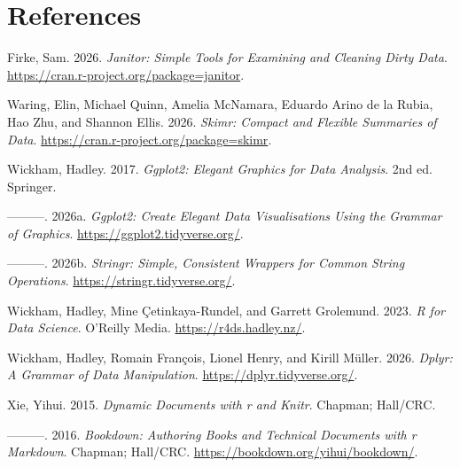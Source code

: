 \documentclass[
  11pt,
  oneside]{book}
\newlength{\cslhangindent}
\newenvironment{CSLReferences}[2] %
 {\begin{list}{}{%
  \setlength{\itemindent}{0pt}
  \setlength{\leftmargin}{0pt}
  \setlength{\parsep}{0pt}
  \ifodd #1
   \setlength{\leftmargin}{\cslhangindent}
   \setlength{\itemindent}{-1\cslhangindent}
  \fi
  \setlength{\itemsep}{#2\baselineskip}}}
 {\end{list}}
\begin{document}
\chapter*{References}\label{references}

\label{refs}
\begin{CSLReferences}{1}{0}
Firke, Sam. 2026. \emph{Janitor: Simple Tools for Examining and Cleaning Dirty Data}. \url{https://cran.r-project.org/package=janitor}.

Waring, Elin, Michael Quinn, Amelia McNamara, Eduardo Arino de la Rubia, Hao Zhu, and Shannon Ellis. 2026. \emph{Skimr: Compact and Flexible Summaries of Data}. \url{https://cran.r-project.org/package=skimr}.

Wickham, Hadley. 2017. \emph{Ggplot2: Elegant Graphics for Data Analysis}. 2nd ed. Springer.

---------. 2026a. \emph{Ggplot2: Create Elegant Data Visualisations Using the Grammar of Graphics}. \url{https://ggplot2.tidyverse.org/}.

---------. 2026b. \emph{Stringr: Simple, Consistent Wrappers for Common String Operations}. \url{https://stringr.tidyverse.org/}.

Wickham, Hadley, Mine Çetinkaya-Rundel, and Garrett Grolemund. 2023. \emph{R for Data Science}. O'Reilly Media. \url{https://r4ds.hadley.nz/}.

Wickham, Hadley, Romain François, Lionel Henry, and Kirill Müller. 2026. \emph{Dplyr: A Grammar of Data Manipulation}. \url{https://dplyr.tidyverse.org/}.

Xie, Yihui. 2015. \emph{Dynamic Documents with r and Knitr}. Chapman; Hall/CRC.

---------. 2016. \emph{Bookdown: Authoring Books and Technical Documents with r Markdown}. Chapman; Hall/CRC. \url{https://bookdown.org/yihui/bookdown/}.

\end{CSLReferences}
\end{document}
